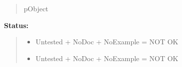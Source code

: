 \begin{boxedminipage}{\funcwidth}
      \begin{quote}
      pObject

      \end{quote}

\textbf{Status:}
\begin{quote}
  \begin{itemize}

  \item
    \setlength{\parskip}{0.6ex}
Untested + NoDoc + NoExample = NOT OK



  \item Untested + NoDoc + NoExample = NOT OK



\end{itemize}

\end{quote}

    \end{boxedminipage}

    \label{xformslib:library:fl_add_clock}

    \vspace{0.5ex}


